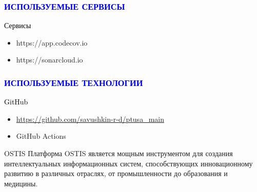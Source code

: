 \documentclass{beamer}
\begin{document}
\begin{frame}
    \frametitle{\textcolor{blue}{ИСПОЛЬЗУЕМЫЕ СЕРВИСЫ}}

    \textcolor{black}{\Large Сервисы}
    \begin{itemize}
        \color{teal}
        \item[\textcolor{teal}{\ding{226}}] https://app.codecov.io
        \item[\textcolor{teal}{\ding{226}}] https://sonarcloud.io
    \end{itemize}
\end{frame}

\begin{frame}
    \frametitle{\textcolor{blue}{ИСПОЛЬЗУЕМЫЕ ТЕХНОЛОГИИ}}

    \textcolor{black}{\Large GitHub}
    \begin{itemize}
        \color{teal}
        \item[\textcolor{teal}{\ding{226}}] \url{https://github.com/savushkin-r-d/ptusa_main}
        \item[\textcolor{teal}{\ding{226}}] GitHub Actions
    \end{itemize}
\end{frame}
\begin{frame}{OSTIS}
    Платформа OSTIS является мощным инструментом для создания интеллектуальных информационных систем, способствующих инновационному развитию в различных отраслях, от промышленности до образования и медицины.
\end{frame}
\end{document}
